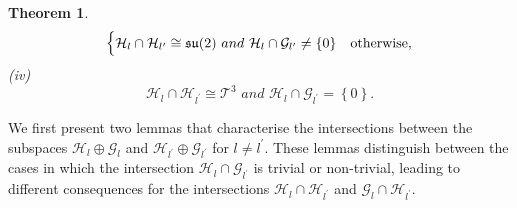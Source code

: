 \documentclass[aps,showpacs,amsmath,amssymb,twocolumn,prx,longbibliography,superscriptaddress,notitlepage,floatfix,10pt]{revtex4-2}
\newtheorem{theorem}{Theorem} %
\begin{document}
\begin{theorem}
\begin{equation}
\begin{cases}
     \mathcal{H}_{l}\cap\mathcal{H}_{l^{\prime}}\cong \mathfrak{su}(2)\,\, and \,\,  \mathcal{H}_{l}\cap\mathcal{G}_{l^{\prime}}\not=\left\{0\right\} &{\rm otherwise},
     \end{cases}
      \label{eq:cond3HG}
 \end{equation}
  (iv)
 \begin{equation}
     \mathcal{H}_{l}\cap\mathcal{H}_{l^{\prime}}\cong \mathcal{T}^{3}\,\, and\,\,
     \mathcal{H}_{l}\cap\mathcal{G}_{l^{\prime}}=\left\{0\right\}.\label{eq:cond4_HG}
 \end{equation}
 \label{theorem:2}
\end{theorem}

We first present two lemmas that characterise the intersections between the subspaces $\mathcal{H}_{l} \oplus \mathcal{G}_{l}$ and $\mathcal{H}_{l^{\prime}} \oplus \mathcal{G}_{l^{\prime}}$ for $l \neq l^{\prime}$. These lemmas distinguish between the cases in which the intersection $\mathcal{H}_{l} \cap \mathcal{G}_{l^{\prime}}$ is trivial or non-trivial, leading to different consequences for the intersections $\mathcal{H}_{l} \cap \mathcal{H}_{l^{\prime}}$ and $\mathcal{G}_{l} \cap \mathcal{H}_{l^{\prime}}$.
\end{document}
